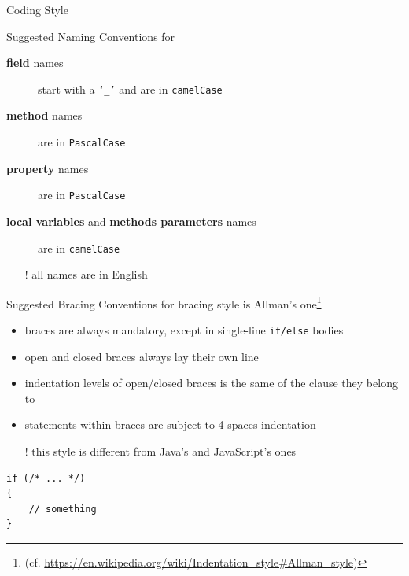\documentclass[presentation]{beamer}
\begin{document}
\begin{frame}{\csharp Coding Style}
\begin{exampleblock}{Suggested Naming Conventions for \csharp}
\begin{description}
            \item[\textbf{field} names] start with a \texttt{`\_'} and are in \texttt{camelCase} 
            
            \item[\textbf{method} names] are in \texttt{PascalCase} 
            
            \item[\textbf{property} names] are in \texttt{PascalCase} 
            
            \item[\textbf{local variables} and \textbf{methods parameters} names] are in \texttt{camelCase} 
            
        \end{description}
        \begin{itemize}
            \item[!] all names are \alert{in English}
        \end{itemize}
    \end{exampleblock}

    \framebreak

    \begin{exampleblock}{Suggested Bracing Conventions for \csharp}
        \csharp bracing style is \alert{Allman's} one\footnote{\tiny(cf. \url{https://en.wikipedia.org/wiki/Indentation_style\#Allman_style})}
        \begin{itemize}
            \item braces are always mandatory, except in single-line \alert{\texttt{if/else}} bodies 
            \item open and closed braces always lay their own line
            \item indentation levels of open/closed braces is the same of the clause they belong to
            \item statements within braces are subject to 4-spaces indentation
            \item[!] this style is different from Java's and JavaScript's ones
        \end{itemize}
\begin{lstlisting}
if (/* ... */)
{
    // something
}
\end{lstlisting}
    \end{exampleblock}


\end{frame}
\end{document}
